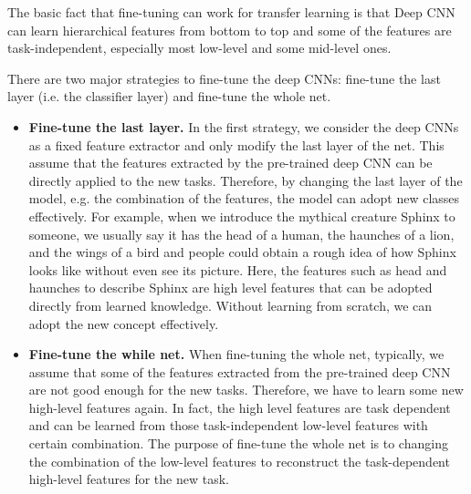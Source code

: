 The basic fact that fine-tuning can work for transfer learning is that Deep CNN can learn hierarchical features from bottom to top and some of the features are task-independent, especially most low-level and some mid-level ones.

There are two major strategies to fine-tune the deep CNNs: fine-tune the last layer (i.e. the classifier layer) and fine-tune the whole net.

\begin{itemize}
	\item \textbf{Fine-tune the last layer.} In the first strategy, we consider the deep CNNs as a fixed feature extractor and only modify the last layer of the net. This assume that the features extracted by the pre-trained deep CNN can be directly applied to the new tasks. Therefore, by changing the last layer of the model, e.g. the combination of the features, the model can adopt new classes effectively. For example, when we introduce the mythical creature Sphinx to someone, we usually say it has the head of a human, the haunches of a lion, and the wings of a bird and people could obtain a rough idea of how Sphinx looks like without even see its picture. Here, the features such as head and haunches to describe Sphinx are high level features that can be adopted directly from learned knowledge. Without learning from scratch, we can adopt the new concept effectively.
	\item \textbf{Fine-tune the while net.} When fine-tuning the whole net, typically, we assume that some of the features extracted from the pre-trained deep CNN are not good enough for the new tasks. Therefore, we have to learn some new high-level features again. In fact, the high level features are task dependent and can be learned from those task-independent low-level features with certain combination. The purpose of fine-tune the whole net is to changing the combination of the low-level features to reconstruct the task-dependent high-level features for the new task. 
\end{itemize}